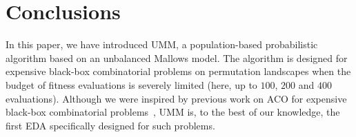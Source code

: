 \documentclass[sigconf,dvipsnames]{acmart}
\begin{document}



\section{Conclusions}\label{sec:conclusions}

In this paper, we have introduced UMM, a population-based probabilistic
algorithm based on an unbalanced Mallows model. The algorithm is designed for
expensive black-box combinatorial problems on permutation landscapes when the budget
of fitness evaluations is severely limited (here, up to $100$, $200$ and $400$ evaluations).
Although we were inspired by previous work on ACO for expensive black-box
combinatorial problems~\citep{PerLopStu2015si}, UMM is, to the best of our
knowledge, the first EDA specifically designed for such problems. 
\end{document}
